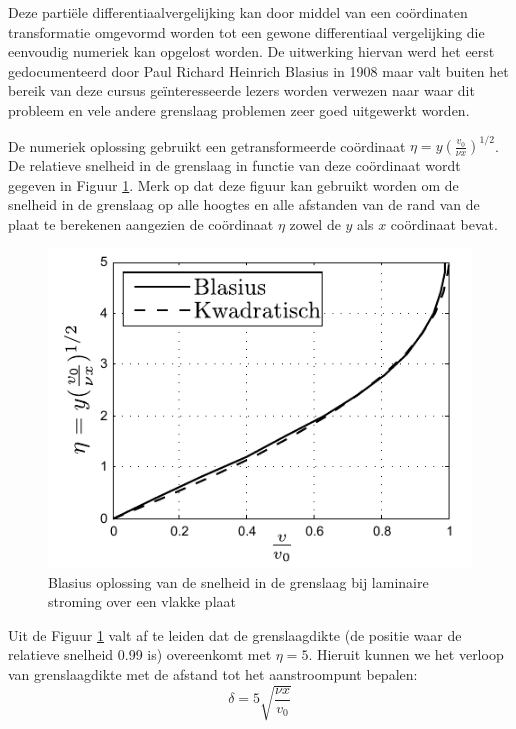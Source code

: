 Deze partiële differentiaalvergelijking kan door middel van een coördinaten transformatie omgevormd worden tot een gewone differentiaal vergelijking die eenvoudig numeriek kan opgelost worden. De uitwerking hiervan werd het eerst gedocumenteerd door Paul Richard Heinrich Blasius in 1908 maar valt buiten het bereik van deze cursus geïnteresseerde lezers worden verwezen naar \cite{Schlichting1979} waar dit probleem en vele andere grenslaag problemen zeer goed uitgewerkt worden.

De numeriek oplossing gebruikt een getransformeerde coördinaat $\eta = y (\frac{v_0}{\nu x})^{1/2}$. De relatieve snelheid in de grenslaag in functie van deze coördinaat wordt gegeven in Figuur  \ref{fig:Grenslaagsnelheid}. Merk op dat deze figuur kan gebruikt worden om de snelheid in de grenslaag op alle hoogtes en alle afstanden van de rand van de plaat te berekenen aangezien de coördinaat $\eta$ zowel de $y$ als $x$ coördinaat bevat.
\begin{figure}[htb]
	\centering
	\includegraphics{fig/uitwendige_stroming/Grenslaagsnelheid}
	\caption{Blasius oplossing van de snelheid in de grenslaag bij laminaire stroming over een vlakke plaat}
	\label{fig:Grenslaagsnelheid}
\end{figure}

Uit de Figuur \ref{fig:Grenslaagsnelheid} valt af te leiden dat de grenslaagdikte (de positie waar de relatieve snelheid 0.99 is) overeenkomt met $\eta = 5$. Hieruit kunnen we het verloop van grenslaagdikte met de afstand tot het aanstroompunt bepalen:
\begin{equation}
	\delta = 5 \sqrt{\frac{\nu x}{v_0}}
\end{equation}

